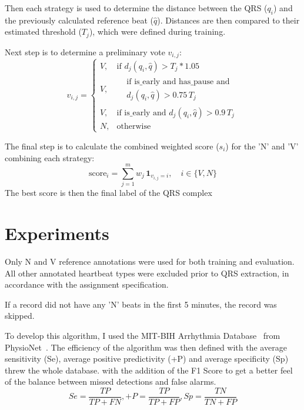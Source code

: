 \documentclass[conference]{IEEEtran}
\begin{document}
\begin{itemize}
    Then each strategy is used to determine the distance between the QRS ($q_i$) and the previously calculated reference beat ($\hat{q}$). Distances are then compared to their estimated threshold ($T_j$), which were defined during training.

    Next step is to determine a preliminary vote $v_{i,j}$:
    \[
        v_{i,j} =
        \begin{cases}
        V, & \text{if } d_j(q_i, \hat{q}) > T_j * 1.05 \\
        V, & 
        \begin{aligned}
            & \text{if is\_early and has\_pause and } \\
            & d_j(q_i, \hat{q}) > 0.75 \, T_j
        \end{aligned} \\[1mm]
        V, & \text{if is\_early and } d_j(q_i, \hat{q}) > 0.9 \, T_j \\
        N, & \text{otherwise}
        \end{cases}
    \]

    The final step is to calculate the combined weighted score ($s_i$) for the 'N' and 'V' combining each strategy:
    \[
        \text{score}_i = \sum_{j=1}^{m} w_j \, \mathbf{1}_{v_{i,j} = i}, \quad i \in \{V, N\}
    \]
    The best score is then the final label of the QRS complex

\end{itemize}

\section{Experiments}
Only N and V reference annotations were used for both training and evaluation. All other annotated heartbeat types were excluded prior to QRS extraction, in accordance with the assignment specification.

If a record did not have any 'N' beats in the first 5 minutes, the record was skipped.

To develop this algorithm, I used the MIT-BIH Arrhythmia Database~\cite{moody2001mitbih} from PhysioNet~\cite{goldberger2000physiobank}. The efficiency of the algorithm was then defined with the average sensitivity (Se), average positive predictivity (+P) and average specificity (Sp) threw the whole database. with the addition of the F1 Score to get a better feel of the balance between missed detections and false alarms.
\[
    Se = \frac{TP}{TP + FN}, +P=\frac{TP}{TP + FP}, Sp = \frac{TN}{TN + FP}
\]
\end{document}
